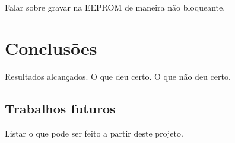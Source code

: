 \documentclass[brazil,pagestart=firstchapter]{abnt}
\begin{document}
Falar sobre gravar na EEPROM de maneira não bloqueante.

\chapter{Conclusões\label{cap:conclusoes}}

Resultados alcançados. O que deu certo. O que não deu certo.

\section{Trabalhos futuros\label{sec:trabalhos_futuros}}

Listar o que pode ser feito a partir deste projeto.







\anexo
\end{document}
